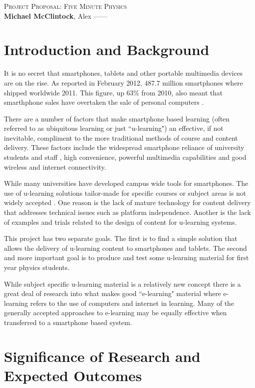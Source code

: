 \documentclass[12pt,a4paper]{article}  %
\begin{document}
\begin{center}
  \textsc{\Large Project Proposal: Five Minute Physics}
  \\[8mm]
  \textbf{Michael McClintock}, Alex ------
\end{center}

\section*{Introduction and Background}

It is no secret that smartphones, tablets and other portable
multimedia devices are on the rise. As reported in February 2012,
487.7 million smartphones where shipped worldwide 2011.  This figure,
up 63\% from 2010, also meant that smarthphone sales have overtaken
the sale of personal computers \cite{canalys}. 

There are a number of factors that make smartphone based learning
(often referred to as ubiquitous learning or just ``u-learning") an
effective, if not inevitable, compliment to the more traditional
methods of course and content delivery. These factors include the
widespread smartphone reliance of university students and staff
\cite{procsmart}, high convenience, powerful
multimedia capabilities and good wireless and internet connectivity. 

While many universities have developed campus wide tools for
smartphones. The use of u-learning solutions tailor-made for specific
courses or subject areas is not widely accepted \cite{procsmart}.
One reason is the lack of mature technology for content delivery that
addresses technical issues such as platform independence. Another is the
lack of examples and trials related to the design of content for
u-learning systems.

This project has two separate goals. The first is to find a simple
solution that allows the delivery of u-learning content to smartphones
and tablets. The second and more important goal is to produce and test
some u-learning material for first year physics students.

While subject specific u-learning material is a relatively new concept
there is a great deal of research into what makes good ``e-learning"
material where e-learning refers to the use of computers and internet
in learning. Many of the generally accepted approaches to e-learning
may be equally effective when transferred to a smartphone based
system.

\section*{Significance of Research and Expected Outcomes}
\end{document}
